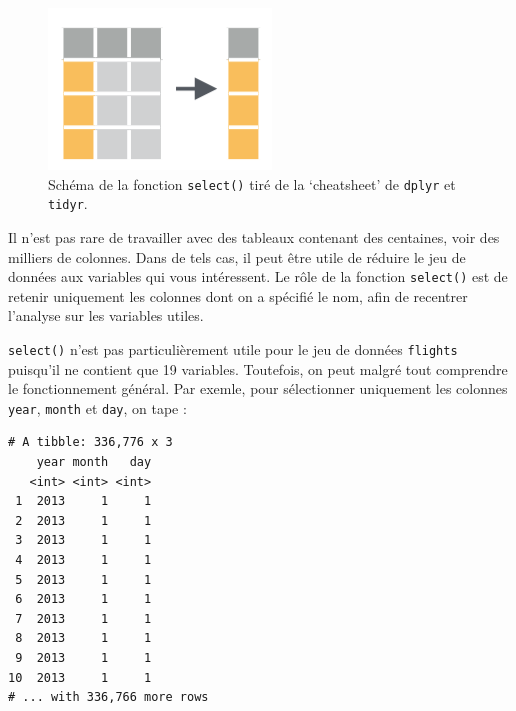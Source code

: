 \documentclass[a4paperpaper,]{article}
\newenvironment{Shaded}{\begin{snugshade}}{\end{snugshade}}
\newcommand{\CommentTok}[1]{\textcolor[rgb]{0.54,0.53,0.53}{#1}}
\newcommand{\KeywordTok}[1]{\textcolor[rgb]{0.12,0.11,0.11}{\textbf{#1}}}
\newcommand{\NormalTok}[1]{\textcolor[rgb]{0.12,0.11,0.11}{#1}}
\newcommand{\OperatorTok}[1]{\textcolor[rgb]{0.12,0.11,0.11}{#1}}
\newcommand{\StringTok}[1]{\textcolor[rgb]{0.75,0.01,0.01}{#1}}
\begin{document}
\begin{figure}[htpb]

{\centering \includegraphics[width=0.5\linewidth]{images/select} 

}

\caption{Schéma de la fonction \texttt{select()} tiré de la `cheatsheet' de \texttt{dplyr} et \texttt{tidyr}.}\label{fig:selectfig}
\end{figure}



Il n'est pas rare de travailler avec des tableaux contenant des centaines, voir des milliers de colonnes. Dans de tels cas, il peut être utile de réduire le jeu de données aux variables qui vous intéressent. Le rôle de la fonction \texttt{select()} est de retenir uniquement les colonnes dont on a spécifié le nom, afin de recentrer l'analyse sur les variables utiles.

\texttt{select()} n'est pas particulièrement utile pour le jeu de données \texttt{flights} puisqu'il ne contient que 19 variables. Toutefois, on peut malgré tout comprendre le fonctionnement général. Par exemle, pour sélectionner uniquement les colonnes \texttt{year}, \texttt{month} et \texttt{day}, on tape :

\begin{Shaded}
\end{Shaded}

\begin{verbatim}
# A tibble: 336,776 x 3
    year month   day
   <int> <int> <int>
 1  2013     1     1
 2  2013     1     1
 3  2013     1     1
 4  2013     1     1
 5  2013     1     1
 6  2013     1     1
 7  2013     1     1
 8  2013     1     1
 9  2013     1     1
10  2013     1     1
# ... with 336,766 more rows
\end{verbatim}
\end{document}
